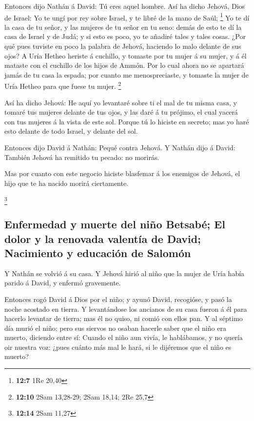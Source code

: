  Entonces dijo Nathán á David: Tú eres aquel hombre. Así ha
dicho Jehová, Dios de Israel: Yo te ungí por rey sobre Israel, y te
libré de la mano de Saúl; \footnote{\textbf{12:7} 1Re 20,40}
 Yo te dí la casa de tu señor, y las mujeres de tu señor en
tu seno: demás de esto te dí la casa de Israel y de Judá; y si esto es
poco, yo te añadiré tales y tales cosas.  ¿Por qué pues
tuviste en poco la palabra de Jehová, haciendo lo malo delante de sus
ojos? A Uría Hetheo heriste á cuchillo, y tomaste por tu mujer á su
mujer, y á él mataste con el cuchillo de los hijos de Ammón.
 Por lo cual ahora no se apartará jamás de tu casa la
espada; por cuanto me menospreciaste, y tomaste la mujer de Uría Hetheo
para que fuese tu mujer. \footnote{\textbf{12:10} 2Sam 13,28-29; 2Sam
  18,14; 2Re 25,7}

 Así ha dicho Jehová: He aquí yo levantaré sobre ti el mal
de tu misma casa, y tomaré tus mujeres delante de tus ojos, y las daré á
tu prójimo, el cual yacerá con tus mujeres á la vista de este sol.
 Porque tú lo hiciste en secreto; mas yo haré esto delante
de todo Israel, y delante del sol.

 Entonces dijo David á Nathán: Pequé contra Jehová. Y
Nathán dijo á David: También Jehová ha remitido tu pecado: no morirás.

 Mas por cuanto con este negocio hiciste blasfemar á los
enemigos de Jehová, el hijo que te ha nacido morirá ciertamente.

\footnote{\textbf{12:14} 2Sam 11,27}

\hypertarget{enfermedad-y-muerte-del-niuxf1o-betsabuxe9-el-dolor-y-la-renovada-valentuxeda-de-david-nacimiento-y-educaciuxf3n-de-salomuxf3n}{%
\subsection{Enfermedad y muerte del niño Betsabé; El dolor y la renovada
valentía de David; Nacimiento y educación de
Salomón}\label{enfermedad-y-muerte-del-niuxf1o-betsabuxe9-el-dolor-y-la-renovada-valentuxeda-de-david-nacimiento-y-educaciuxf3n-de-salomuxf3n}}

 Y Nathán se volvió á su casa. Y Jehová hirió al niño que
la mujer de Uría había parido á David, y enfermó gravemente.

 Entonces rogó David á Dios por el niño; y ayunó David,
recogióse, y pasó la noche acostado en tierra.  Y
levantándose los ancianos de su casa fueron á él para hacerlo levantar
de tierra; mas él no quiso, ni comió con ellos pan.  Y al
séptimo día murió el niño; pero sus siervos no osaban hacerle saber que
el niño era muerto, diciendo entre sí: Cuando el niño aun vivía, le
hablábamos, y no quería oir nuestra voz: ¿pues cuánto más mal le hará,
si le dijéremos que el niño es muerto?

